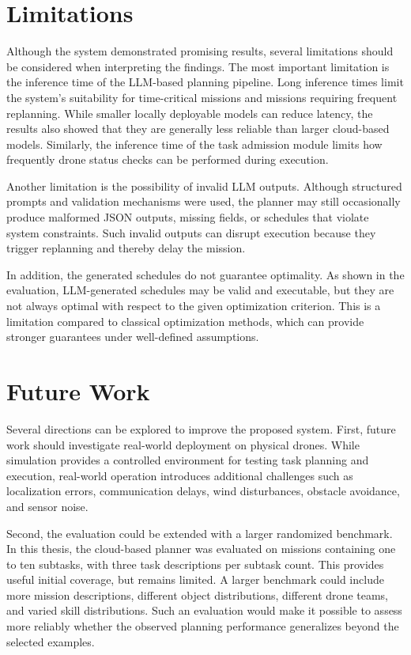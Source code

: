 \section{Limitations}
Although the system demonstrated promising results, several limitations should be considered when interpreting the findings.
The most important limitation is the inference time of the LLM-based planning pipeline. Long inference times limit the system's
suitability for time-critical missions and missions requiring frequent replanning. While smaller locally deployable models can
reduce latency, the results also showed that they are generally less reliable than larger cloud-based models. Similarly, the
inference time of the task admission module limits how frequently drone status checks can be performed during execution.

Another limitation is the possibility of invalid LLM outputs. Although structured prompts and validation mechanisms were used,
the planner may still occasionally produce malformed JSON outputs, missing fields, or schedules that violate system constraints.
Such invalid outputs can disrupt execution because they trigger replanning and thereby delay the mission.

In addition, the generated schedules do not guarantee optimality. As shown in the evaluation, LLM-generated schedules may be valid
and executable, but they are not always optimal with respect to the given optimization criterion. This is a limitation compared to
classical optimization methods, which can provide stronger guarantees under well-defined assumptions.

\section{Future Work}
Several directions can be explored to improve the proposed system. First, future work should investigate real-world
deployment on physical drones. While simulation provides a controlled environment for testing task planning and execution, 
real-world operation introduces additional challenges such as localization errors, communication delays, wind disturbances, 
obstacle avoidance, and sensor noise.

Second, the evaluation could be extended with a larger randomized benchmark. In this thesis, the cloud-based planner was
evaluated on missions containing one to ten subtasks, with three task descriptions per subtask count. This provides useful
initial coverage, but remains limited. A larger benchmark could include more mission descriptions, different object
distributions, different drone teams, and varied skill distributions. Such an evaluation would make it possible to assess 
more reliably whether the observed planning performance generalizes beyond the selected examples.

